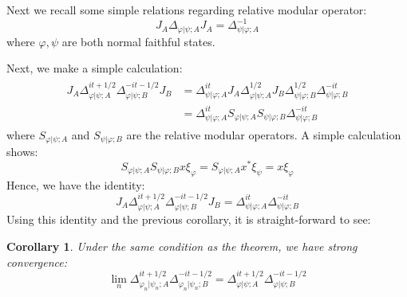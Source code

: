 \documentclass[a4paper,11pt]{article}
\newtheorem{corollary}[theorem]{Corollary}
\theoremstyle{definition}
\begin{document}
Next we recall some simple relations regarding relative modular operator:
\begin{equation}
    J_A\Delta_{\varphi|\psi;A}J_A = \Delta^{-1}_{\psi|\varphi;A}
\end{equation}
where $\varphi,\psi$ are both normal faithful states.

Next, we make a simple calculation:
\begin{align}
    \begin{split}
        J_A \Delta^{it + 1/2}_{\varphi|\psi;A}\Delta^{-it-1/2}_{\varphi|\psi;B} J_B &= \Delta^{it}_{\psi|\varphi;A} J_A\Delta^{1/2}_{\varphi|\psi;A}J_B\Delta^{1/2}_{\psi|\varphi;B}\Delta_{\psi|\varphi;B}^{-it}
        \\&=\Delta^{it}_{\psi|\varphi;A}S_{\varphi|\psi;A}S_{\psi|\varphi;B}\Delta^{-it}_{\psi|\varphi;B}
    \end{split}
\end{align}
where $S_{\varphi|\psi;A}$ and $S_{\psi|\varphi;B}$ are the relative modular operators. A simple calculation shows:
\begin{equation}
    S_{\varphi|\psi;A}S_{\psi|\varphi;B}x\xi_{\varphi} = S_{\varphi|\psi;A}x^*\xi_{\psi} = x\xi_{\varphi}
\end{equation}
Hence, we have the identity:
\begin{equation}
    J_A\Delta^{it+1/2}_{\varphi|\psi;A}\Delta^{-it-1/2}_{\varphi|\psi;B}J_B = \Delta^{it}_{\psi|\varphi;A}\Delta^{-it}_{\psi|\varphi;B}
\end{equation}
Using this identity and the previous corollary, it is straight-forward to see:
\begin{corollary}
    Under the same condition as the theorem, we have strong convergence:
    \begin{equation}
        \lim_n\Delta^{it + 1/2}_{\varphi_n|\psi_n;A}\Delta^{-it-1/2}_{\varphi_n|\psi_n;B} = \Delta^{it + 1/2}_{\varphi|\psi;A}\Delta^{-it-1/2}_{\varphi|\psi;B}
    \end{equation}
\end{corollary}
\end{document}
